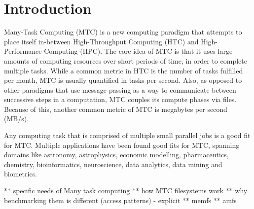 
\chapter{Introduction} %

\label{Chapter1} %



Many-Task Computing (MTC)\cite{mtc} is a new computing paradigm that attempts to place itself in-between High-Throughput Computing (HTC) and High-Performance Computing (HPC). The core idea of MTC is that it uses large amounts of computing resources over short periods of time, in order to complete multiple tasks. While a common metric in HTC is the number of tasks fulfilled per month, MTC is usually quantified in tasks per second. Also, as opposed to other paradigms that use message passing as a way to communicate between successive steps in a computation, MTC couples its compute phases via files. Because of this, another common metric of MTC is megabytes per second (MB/s).

Any computing task that is comprised of multiple small parallel jobs is a good fit for MTC. Multiple applications have been found good fits for MTC\cite{mtc}, spanning domains like astronomy, astrophysics, economic modelling, pharmaceutics, chemistry, bioinformatics, neuroscience, data analytics, data mining and biometrics.

** specific needs of Many task computing
** how MTC filesystems work
** why benchmarking them is different (access patterns) - explicit
** memfs
** amfs
